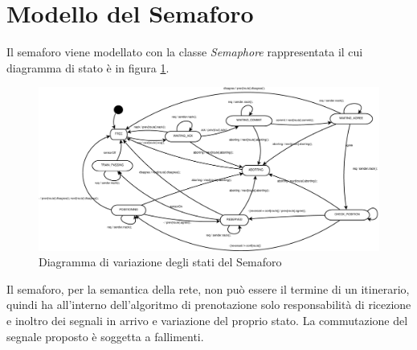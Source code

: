 \section{Modello del Semaforo}
Il semaforo viene modellato con la classe \textit{Semaphore} rappresentata il cui diagramma di stato è in figura \ref{fig:semaforo}.
\begin{figure}

\centering
\includegraphics[width=24cm]{imgs/Switch.eps}

\caption{Diagramma di variazione degli stati del Semaforo}\label{fig:semaforo}

\end{figure}

Il semaforo, per la semantica della rete, non può essere il termine di un
itinerario, quindi ha all'interno dell'algoritmo di prenotazione solo
responsabilità di ricezione e inoltro dei segnali in arrivo e variazione del
proprio stato. La commutazione del segnale proposto è soggetta a fallimenti.


